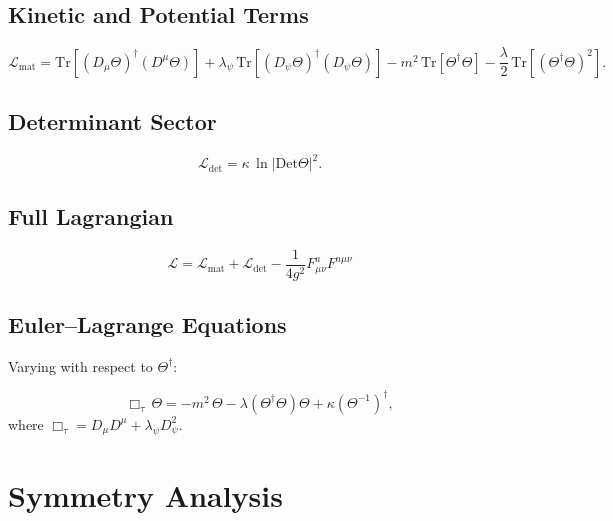 \documentclass[12pt,a4paper]{article}
\newcommand{\Tr}{\mathrm{Tr}}
\newcommand{\Det}{\mathrm{Det}}
\newcommand{\Lag}{\mathcal{L}}
\begin{document}
\subsection{Kinetic and Potential Terms}

\begin{equation}
  \Lag_{\mathrm{mat}}
  = \Tr\!\left[(D_\mu\Theta)^\dagger(D^\mu\Theta)\right]
    + \lambda_\psi\,\Tr\!\left[(D_\psi\Theta)^\dagger(D_\psi\Theta)\right]
    - m^2\,\Tr[\Theta^\dagger\Theta]
    - \frac{\lambda}{2}\,\Tr[(\Theta^\dagger\Theta)^2].
  \label{eq:L_mat}
\end{equation}

\subsection{Determinant Sector}

\begin{equation}
  \Lag_{\mathrm{det}}
  = \kappa\,\ln\!\left|\Det\Theta\right|^2.
  \label{eq:L_det}
\end{equation}

\subsection{Full Lagrangian}

\begin{equation}
  \boxed{
    \Lag = \Lag_{\mathrm{mat}} + \Lag_{\mathrm{det}} - \frac{1}{4g^2}F_{\mu\nu}^a F^{a\mu\nu}
  }
  \label{eq:L_full}
\end{equation}

\subsection{Euler--Lagrange Equations}

Varying with respect to $\Theta^\dagger$:

\begin{equation}
  \Box_\tau\,\Theta
  = -m^2\,\Theta
    - \lambda(\Theta^\dagger\Theta)\Theta
    + \kappa(\Theta^{-1})^\dagger,
  \label{eq:EOM}
\end{equation}
where $\Box_\tau = D_\mu D^\mu + \lambda_\psi D_\psi^2$.

\section{Symmetry Analysis}
\label{sec:symmetry}
\end{document}
